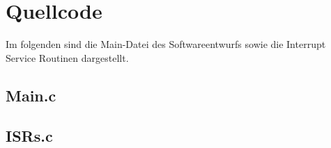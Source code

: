\section{Quellcode}
\label{app:Quellcode}
Im folgenden sind die Main-Datei des Softwareentwurfs sowie die Interrupt Service Routinen dargestellt.
\subsection{Main.c}

\subsection{ISRs.c}

%